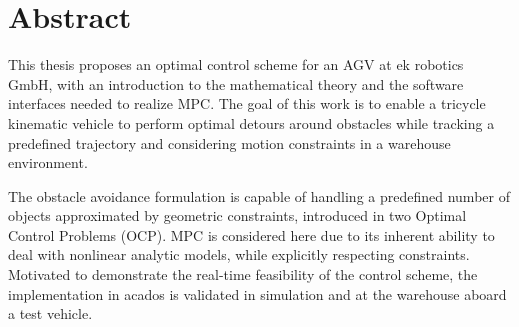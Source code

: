 \chapter*{Abstract}

This thesis proposes an optimal control scheme for an \ac{AGV} at ek robotics GmbH, with an introduction to the mathematical theory and the software interfaces needed to realize \ac{MPC}. 
The goal of this work is to enable a tricycle kinematic vehicle to perform optimal detours around obstacles while tracking a predefined trajectory and considering motion constraints in a warehouse environment.
\par The obstacle avoidance formulation is capable of handling a predefined number of objects approximated by geometric constraints, introduced in two Optimal Control Problems (OCP).
\ac{MPC} is considered here due to its inherent ability to deal with nonlinear analytic models, while explicitly respecting constraints. Motivated to demonstrate the real-time feasibility of the control scheme, the implementation in acados \cite{verschueren_acados_2020} is validated in simulation and at the warehouse aboard a test vehicle.
